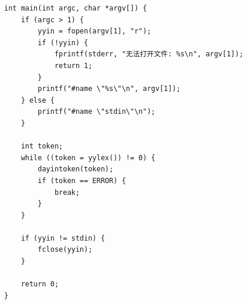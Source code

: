 \documentclass[twocolumn]{article}
\begin{document}
\begin{lstlisting}[language=Flex, caption={cool.flex 完整源码}, label=code:cool_flex]
int main(int argc, char *argv[]) {
    if (argc > 1) {
        yyin = fopen(argv[1], "r");
        if (!yyin) {
            fprintf(stderr, "无法打开文件: %s\n", argv[1]);
            return 1;
        }
        printf("#name \"%s\"\n", argv[1]);
    } else {
        printf("#name \"stdin\"\n");
    }
    
    int token;
    while ((token = yylex()) != 0) {
        dayintoken(token);
        if (token == ERROR) {
            break;
        }
    }
    
    if (yyin != stdin) {
        fclose(yyin);
    }
    
    return 0;
}
\end{lstlisting}
\end{document}
